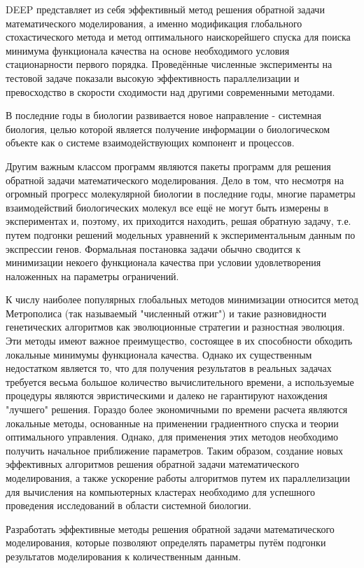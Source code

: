 DEEP представляет из себя эффективный метод решения обратной задачи математического моделирования, а именно модификация глобального стохастического метода и метод оптимального наискорейшего спуска для поиска минимума функционала качества на основе необходимого условия стационарности первого порядка. Проведённые численные эксперименты на тестовой задаче показали высокую эффективность параллелизации и превосходство в скорости сходимости над другими современными методами.

В последние годы в биологии развивается новое направление - системная биология, целью которой является получение информации о биологическом объекте как о системе взаимодействующих компонент и процессов.

Другим важным классом программ являются пакеты программ для решения обратной задачи математического моделирования. Дело в том, что несмотря на огромный прогресс молекулярной биологии в последние годы, многие параметры взаимодействий биологических молекул все ещё не могут быть измерены в экспериментах и, поэтому, их приходится находить, решая обратную задачу, т.е. путем подгонки решений модельных уравнений к экспериментальным данным по экспрессии генов. Формальная постановка задачи обычно сводится к минимизации некоего функционала качества при условии удовлетворения наложенных на параметры ограничений.

К числу наиболее популярных глобальных методов минимизации относится метод Метрополиса (так называемый "численный отжиг") и такие разновидности генетических алгоритмов как эволюционные стратегии и разностная эволюция. Эти методы имеют важное преимущество, состоящее в их способности обходить локальные минимумы функционала качества. Однако их существенным недостатком является то, что для получения результатов в реальных задачах требуется весьма большое количество вычислительного времени, а используемые процедуры являются эвристическими и далеко не гарантируют нахождения "лучшего" решения. Гораздо более экономичными по времени расчета являются локальные методы, основанные на применении градиентного спуска и теории оптимального управления. Однако, для применения этих методов необходимо получить начальное приближение параметров. Таким образом, создание новых эффективных алгоритмов решения обратной задачи математического моделирования, а также ускорение работы алгоритмов путем их параллелизации для вычисления на компьютерных кластерах необходимо для успешного проведения исследований в области системной биологии.

Разработать эффективные методы решения обратной задачи математического моделирования, которые позволяют определять параметры путём подгонки результатов моделирования к количественным данным.

